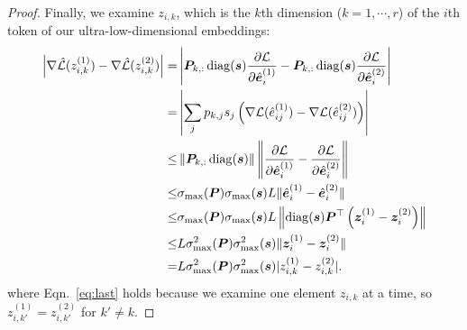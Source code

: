 \begin{proof}
    Finally, we examine $z_{i,k}$, which is the $k$th dimension ($k=1,\cdots, r$) of the $i$th token of our ultra-low-dimensional embeddings: \begin{align}
        \left|\nabla \hat{{\mathcal{L}}}(z_{i,k}^{(1)}) - \nabla \hat{{\mathcal{L}}}(z_{i,k}^{(2)})\right|
        =& \left| {\bm{P}}_{k,:} \operatorname{diag}({\bm{s}}) 
        \frac{\partial {\mathcal{L}}}{\partial \hat {{\bm{e}}}_i^{(1)}}
         - {\bm{P}}_{k,:} \operatorname{diag}({\bm{s}}) \frac{\partial {\mathcal{L}}}{\partial \hat {{\bm{e}}}_i^{(2)}} \right| \\
        =& \left| \sum_j p_{k,j} s_j \left(\nabla {\mathcal{L}}(\hat e_{ij}^{(1)}) -  \nabla {\mathcal{L}}(\hat e_{ij}^{(2)})  \right)\right| \\
        \le& \left\| {\bm{P}}_{k,:} \operatorname{diag}({\bm{s}}) \right\| \left\| \frac{\partial {\mathcal{L}}}{\partial \hat {{\bm{e}}}_i^{(1)}} -  \frac{\partial {\mathcal{L}}}{\partial \hat {{\bm{e}}}_i^{(2)}} \right\| \\
        \le& \sigma_{\max}({\bm{P}}) \sigma_{\max}({\bm{s}}) L \| \hat{{\bm{e}}}_i^{(1)} - \hat{{\bm{e}}}_i^{(2)} \| \\
        \le&  \sigma_{\max}({\bm{P}}) \sigma_{\max}({\bm{s}}) L \left\| \operatorname{diag}({\bm{s}}) {\bm{P}}^\top \left({\bm{z}}_i^{(1)} - {\bm{z}}_i^{(2)}\right) \right\| \\
        \le& L  \sigma_{\max}^2({\bm{P}}) \sigma_{\max}^2({\bm{s}})  \| {\bm{z}}_i^{(1)} - {\bm{z}}_i^{(2)}\| \\
        =& L  \sigma_{\max}^2({\bm{P}}) \sigma_{\max}^2({\bm{s}})  |z_{i,k}^{(1)} - z_{i,k}^{(2)}|. \label{eq:last}
    \end{align}
where Eqn.~\eqref{eq:last} holds because we examine one element $z_{i,k}$ at a time, so $z_{i,k'}^{(1)}=z_{i,k'}^{(2)}$ for $k'\ne k$.


\end{proof}
